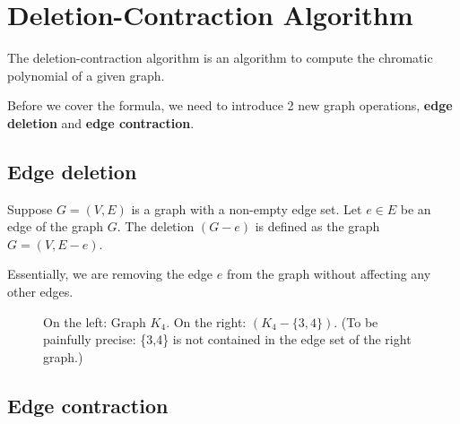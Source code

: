 \documentclass[12pt]{exam}
\begin{document}
\section{Deletion-Contraction Algorithm}

The deletion-contraction algorithm is an algorithm to compute the chromatic polynomial of a given graph.

Before we cover the formula, we need to introduce 2 new graph operations, \textbf{edge deletion} and \textbf{edge contraction}.

\subsection*{Edge deletion}

Suppose $G = (V, E)$ is a graph with a non-empty edge set. Let $e \in E$ be  an edge of the graph $G$. The deletion $(G - e)$ is defined as the graph $G = (V, E - e)$.

Essentially, we are removing the edge $e$ from the graph without affecting any other edges.

\begin{figure}[h]

    \centering
    

    \caption{On the left: Graph $K_4$. On the right: $(K_4 - \{3,4\})$. (To be painfully precise: \{3,4\} is not contained in the edge set of the right graph.)}
    
\end{figure}


\subsection*{Edge contraction}
\end{document}
